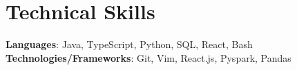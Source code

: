 \section{Technical Skills}
\begin{itemize}[leftmargin=0.15in, label={}]
	\small{\item{
	      \textbf{Languages}{: Java, TypeScript, Python, SQL, React, Bash } \\
	      \textbf{Technologies/Frameworks}{: Git, Vim, React.js, Pyspark, Pandas }}} \\
\end{itemize}
